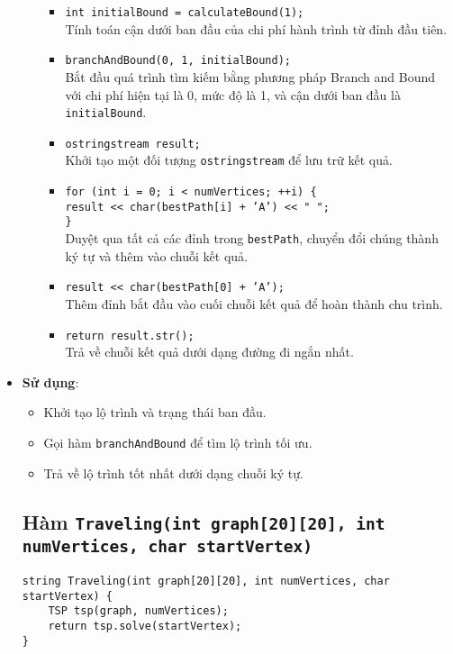 \documentclass[a4paper]{article}
\begin{document}
\begin{itemize}
\begin{itemize}
\begin{itemize}
        \item \texttt{int initialBound = calculateBound(1);} \\ 
        Tính toán cận dưới ban đầu của chi phí hành trình từ đỉnh đầu tiên.

        \item \texttt{branchAndBound(0, 1, initialBound);} \\ 
        Bắt đầu quá trình tìm kiếm bằng phương pháp Branch and Bound với chi phí hiện tại là 0, mức độ là 1, và cận dưới ban đầu là \texttt{initialBound}.

        \item \texttt{ostringstream result;} \\ 
        Khởi tạo một đối tượng \texttt{ostringstream} để lưu trữ kết quả.

        \item \texttt{for (int i = 0; i < numVertices; ++i) \{\\
        \quad result << char(bestPath[i] + 'A') << " ";\\
        \}} \\ 
        Duyệt qua tất cả các đỉnh trong \texttt{bestPath}, chuyển đổi chúng thành ký tự và thêm vào chuỗi kết quả.

        \item \texttt{result << char(bestPath[0] + 'A');} \\ 
        Thêm đỉnh bắt đầu vào cuối chuỗi kết quả để hoàn thành chu trình.

        \item \texttt{return result.str();} \\ 
        Trả về chuỗi kết quả dưới dạng đường đi ngắn nhất.
    \end{itemize}
\end{itemize}
     \item \textbf{Sử dụng}:
    \begin{itemize}
        \item Khởi tạo lộ trình và trạng thái ban đầu.
        \item Gọi hàm \texttt{branchAndBound} để tìm lộ trình tối ưu.
        \item Trả về lộ trình tốt nhất dưới dạng chuỗi ký tự.
    \end{itemize}


\subsection*{Hàm \texttt{Traveling(int graph[20][20], int numVertices, char startVertex)}}
\begin{lstlisting}[style=cppstyle]
string Traveling(int graph[20][20], int numVertices, char startVertex) {
    TSP tsp(graph, numVertices);
    return tsp.solve(startVertex);
}
\end{lstlisting}



\end{itemize}
\end{document}
